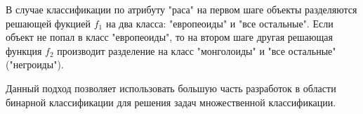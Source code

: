 \documentclass[12pt,a4paper]{article}
\begin{document}
В случае классификации по атрибуту "раса" на первом шаге объекты разделяются решающей фукцией $f_1$ на два класса: "европеоиды" и "все остальные". Если объект не попал в класс "европеоиды", то на втором шаге другая решающая функция $f_2$ производит разделение на класс "монголоиды" и "все остальные" ("негроиды").

Данный подход позволяет использовать большую часть разработок в области бинарной классификации для решения задач множественной классификации.
\end{document}
